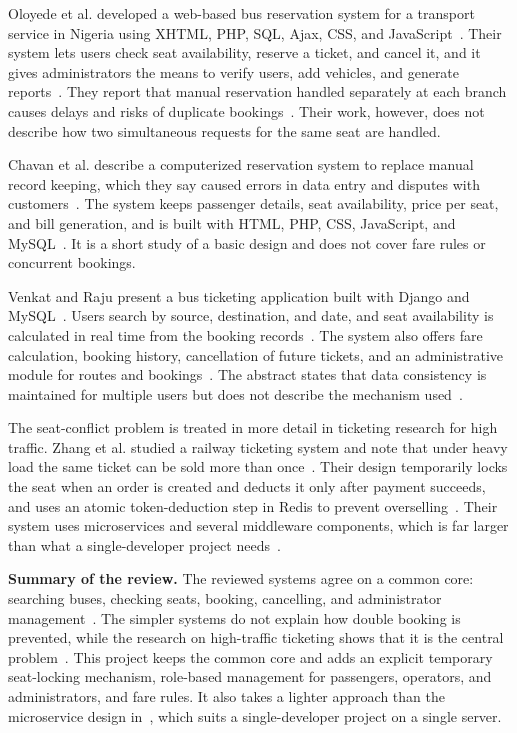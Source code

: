 Oloyede et al. developed a web-based bus reservation system for a transport service in Nigeria using XHTML, PHP, SQL, Ajax, CSS, and JavaScript~\cite{oloyede}. Their system lets users check seat availability, reserve a ticket, and cancel it, and it gives administrators the means to verify users, add vehicles, and generate reports~\cite{oloyede}. They report that manual reservation handled separately at each branch causes delays and risks of duplicate bookings~\cite{oloyede}. Their work, however, does not describe how two simultaneous requests for the same seat are handled.

Chavan et al. describe a computerized reservation system to replace manual record keeping, which they say caused errors in data entry and disputes with customers~\cite{chavan}. The system keeps passenger details, seat availability, price per seat, and bill generation, and is built with HTML, PHP, CSS, JavaScript, and MySQL~\cite{chavan}. It is a short study of a basic design and does not cover fare rules or concurrent bookings.

Venkat and Raju present a bus ticketing application built with Django and MySQL~\cite{venkat}. Users search by source, destination, and date, and seat availability is calculated in real time from the booking records~\cite{venkat}. The system also offers fare calculation, booking history, cancellation of future tickets, and an administrative module for routes and bookings~\cite{venkat}. The abstract states that data consistency is maintained for multiple users but does not describe the mechanism used~\cite{venkat}.

The seat-conflict problem is treated in more detail in ticketing research for high traffic. Zhang et al. studied a railway ticketing system and note that under heavy load the same ticket can be sold more than once~\cite{zhang}. Their design temporarily locks the seat when an order is created and deducts it only after payment succeeds, and uses an atomic token-deduction step in Redis to prevent overselling~\cite{zhang}. Their system uses microservices and several middleware components, which is far larger than what a single-developer project needs~\cite{zhang}.

\textbf{Summary of the review.} The reviewed systems agree on a common core: searching buses, checking seats, booking, cancelling, and administrator management~\cite{oloyede,chavan,venkat}. The simpler systems do not explain how double booking is prevented, while the research on high-traffic ticketing shows that it is the central problem~\cite{zhang}. This project keeps the common core and adds an explicit temporary seat-locking mechanism, role-based management for passengers, operators, and administrators, and fare rules. It also takes a lighter approach than the microservice design in~\cite{zhang}, which suits a single-developer project on a single server.

